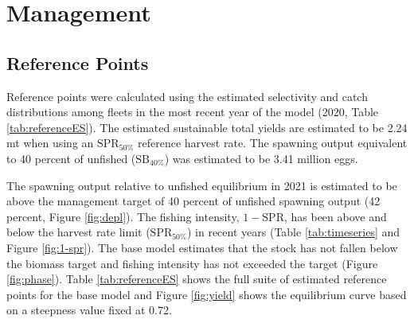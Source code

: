 \documentclass[11pt,
  english,
  a4paper,
]{article}
\begin{document}
\leavevmode\tagmcend\tagstructend\par


\hypertarget{management}{%
\section{Management}\label{management}}

\leavevmode\tagmcend\tagstructend


\hypertarget{reference-points}{%
\subsection{Reference Points}\label{reference-points}}

\leavevmode\tagmcend\tagstructend


Reference points were calculated using the estimated selectivity and catch distributions among fleets in the most recent year of the model (2020, Table \ref{tab:referenceES}). The estimated sustainable total yields are estimated to be 2.24 mt when using an {\(\text{SPR}_{50\%}\)\leavevmode\tagmcend\tagstructend} reference harvest rate. The spawning output equivalent to 40 percent of unfished ({\(\text{SB}_{40\%}\)\leavevmode\tagmcend\tagstructend}) was estimated to be 3.41 million eggs.

\leavevmode\tagmcend\tagstructend\par


The spawning output relative to unfished equilibrium in 2021 is estimated to be above the management target of 40 percent of unfished spawning output (42 percent, Figure \ref{fig:depl}). The fishing intensity, {\(1-\text{SPR}\)\leavevmode\tagmcend\tagstructend}, has been above and below the harvest rate limit ({\(\text{SPR}_{50\%}\)\leavevmode\tagmcend\tagstructend}) in recent years (Table \ref{tab:timeseries} and Figure \ref{fig:1-spr}). The base model estimates that the stock has not fallen below the biomass target and fishing intensity has not exceeded the target (Figure \ref{fig:phase}). Table \ref{tab:referenceES} shows the full suite of estimated reference points for the base model and Figure \ref{fig:yield} shows the equilibrium curve based on a steepness value fixed at 0.72.
\end{document}
